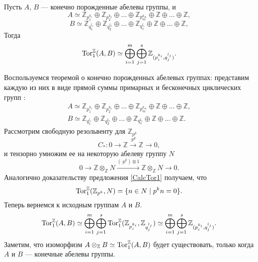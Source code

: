     \begin{Proposal}
        Пусть $A$, $B$ --- конечно порожденные абелевы группы, и
        $$
            A \simeq \mathbb{Z}_{p_1^{k_1}} \oplus \mathbb{Z}_{p_2^{k_2}} \oplus \dots \oplus \mathbb{Z}_{p_m^{k_m}} \oplus \mathbb{Z} \oplus \dots \oplus \mathbb{Z},
        $$
        $$
            B \simeq \mathbb{Z}_{q_1^{l_1}} \oplus \mathbb{Z}_{q_2^{l_2}} \oplus \dots \oplus \mathbb{Z}_{q_s^{l_s}} \oplus \mathbb{Z} \oplus \dots \oplus \mathbb{Z},
        $$
        Тогда 
        $$\textup{Tor}_1^{\mathbb{Z}}(A, B) \simeq \bigoplus_{i=1}^{m} \bigoplus_{j=1}^{s} \mathbb{Z}_{(p_i^{k_i}, q_j^{l_j})}.$$
    \end{Proposal}
    \begin{Proof}
        Воспользуемся теоремой о конечно порожденных абелевых группах: представим каждую из них в виде прямой суммы примарных и бесконечных циклических групп \cite{Vinberg}:
        \begin{gather*}
            A \simeq \mathbb{Z}_{p_1^{k_1}} \oplus \mathbb{Z}_{p_2^{k_2}} \oplus \dots \oplus \mathbb{Z}_{p_m^{k_m}} \oplus \mathbb{Z} \oplus \dots \oplus \mathbb{Z},\\
            B \simeq \mathbb{Z}_{q_1^{l_1}} \oplus \mathbb{Z}_{q_2^{l_2}} \oplus \dots \oplus \mathbb{Z}_{q_s^{l_s}} \oplus \mathbb{Z} \oplus \dots \oplus \mathbb{Z}.
        \end{gather*}
        Рассмотрим свободную резольвенту для $\mathbb{Z}_{p^k}$ 
        \begin{equation*}
            C_* : 0 \rightarrow \mathbb{Z} \xrightarrow{\cdot p^k} \mathbb{Z} \rightarrow 0,
        \end{equation*}
        и тензорно умножим ее на некоторую абелеву группу $N$
        \begin{equation*}
             0 \rightarrow \mathbb{Z} \otimes_\mathbb{Z} N \xrightarrow{(\cdot p^k) \otimes 1} \mathbb{Z} \otimes_\mathbb{Z} N \rightarrow 0.
        \end{equation*}
        Аналогично доказательству предложения \ref{CalcTor1} получаем, что 
        \begin{equation*}
            \textup{Tor}_1^\mathbb{Z}(\mathbb{Z}_{p^k}, N) = \{n \in N \mid p^kn = 0\}.
        \end{equation*}
        Теперь вернемся к исходным группам $A$ и $B$.
        \begin{equation*}
            \textup{Tor}_1^\mathbb{Z}(A, B) \simeq \bigoplus_{i=1}^{m} \bigoplus_{j=1}^{s} \textup{Tor}_1^\mathbb{Z}(\mathbb{Z}_{p_i^{k_i}}, \mathbb{Z}_{q_j^{l_j}}) \simeq 
            \bigoplus_{i=1}^{m} \bigoplus_{j=1}^{s} \mathbb{Z}_{(p_i^{k_i}, q_j^{l_j})}.
        \end{equation*}
        Заметим, что изоморфизм $A \otimes_{\mathbb{Z}} B \simeq \textup{Tor}_1^{\mathbb{Z}}(A, B)$ будет существовать, только когда $A$ и $B$ --- конечные абелевы группы. 
    \end{Proof}